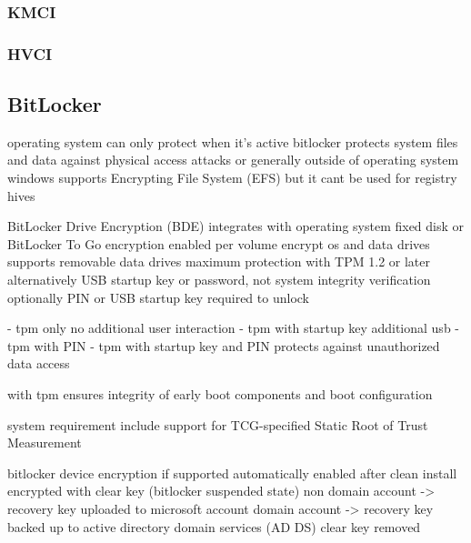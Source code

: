 \subsubsection{KMCI}
\subsubsection{HVCI}
\subsection{BitLocker}

\cite{microsoft-how-windows-uses-the-tpm}


operating system can only protect when it's active
bitlocker protects system files and data against physical access attacks or generally outside of operating system
windows supports Encrypting File System (EFS) but it cant be used for registry hives
\cite[9. BitLocker Drive encryption]{windows-internals-6-part2}

\cite{microsoft-bitlocker-overview}
\cite{microsoft-bitlocker-device-encryption}
BitLocker Drive Encryption (BDE) integrates with operating system
fixed disk or BitLocker To Go
encryption enabled per volume
encrypt os and data drives
supports removable data drives
maximum protection with TPM 1.2 or later
alternatively USB startup key or password, not system integrity verification
optionally PIN or USB startup key required to unlock

- tpm only
no additional user interaction
- tpm with startup key
additional usb
- tpm with PIN
- tpm with startup key and PIN
protects against unauthorized data access
\cite{microsoft-bitlocker-countermeasures}

with tpm ensures integrity of early boot components and boot configuration


system requirement
include support for TCG-specified Static Root of Trust Measurement

\cite{microsoft-bitlocker-device-encryption}

bitlocker device encryption if supported automatically enabled
after clean install encrypted with clear key (bitlocker suspended state)
non domain account -> recovery key uploaded to microsoft account
domain account -> recovery key backed up to active directory domain services (AD DS)
clear key removed


